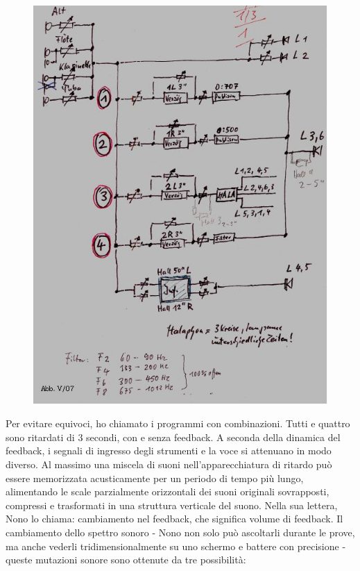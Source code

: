 \begin{figure}[htbp]
\begin{center}
\includegraphics[width=1\textwidth]{images/nono/hph/ab_v_07.jpg}
\caption{}
\label{hph-img7}
\end{center}
\end{figure}

Per evitare equivoci, ho chiamato i programmi con combinazioni. Tutti e quattro sono ritardati di 3 secondi, con e senza feedback. A seconda della dinamica del feedback, i segnali di ingresso degli strumenti e la voce si attenuano in modo diverso. Al massimo una miscela di suoni nell'apparecchiatura di ritardo può essere memorizzata acusticamente per un periodo di tempo più lungo, alimentando le scale parzialmente orizzontali dei suoni originali sovrapposti, compressi e trasformati in una struttura verticale del suono. Nella sua lettera, Nono lo chiama: cambiamento nel feedback, che significa volume di feedback. Il cambiamento dello spettro sonoro - Nono non solo può ascoltarli durante le prove, ma anche vederli tridimensionalmente su uno schermo e battere con precisione - queste mutazioni sonore sono ottenute da tre possibilità: 

